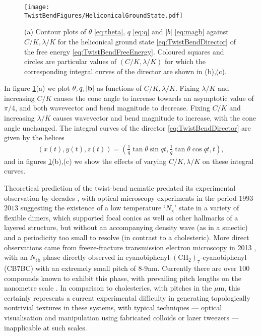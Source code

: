 \begin{figure}[htbp]
    \centering
    \texttt{[image: \\TwistBendFigures/HeliconicalGroundState.pdf]}
    \caption[Heliconical ground state of a twist-bend nematic.]{(a) Contour plots of $\theta$ \eqref{eq:theta}, $q$ \eqref{eq:q} and $|b|$ \eqref{eq:magb} against $C/K, \lambda/K$ for the heliconical ground state \eqref{eq:TwistBendDirector} of the free energy \eqref{eq:TwistBendFreeEnergy}. Coloured squares and circles are particular values of $(C/K, \lambda /K)$ for which the corresponding integral curves of the director are shown in (b),(c).}
    \label{fig:HeliconicalGroundState}
\end{figure}
In figure \ref{fig:HeliconicalGroundState}(a) we plot $\theta, q, |\mathbf{b}|$ as functions of $C/K, \lambda/K$. Fixing $\lambda/K$ and increasing $C/K$ causes the cone angle to increase towards an asymptotic value of $\pi/4$, and both wavevector and bend magnitude to decrease. Fixing $C/K$ and increasing $\lambda/K$ causes wavevector and bend magnitude to increase, with the cone angle unchanged. The integral curves of the director \eqref{eq:TwistBendDirector} are given by the helices
\begin{align}
    (x(t),y(t),z(t)) = (\frac{1}{q} \tan \theta \sin qt, \frac{1}{q} \tan \theta \cos qt,t),
\end{align}
and in figures \ref{fig:HeliconicalGroundState}(b),(c) we show the effects of varying $C/K, \lambda/K$ on these integral curves.

Theoretical prediction of the twist-bend nematic predated its experimental observation by decades \citep{Lavrentovich2018}, with optical microscopy experiments in the period $1993$--$2013$ suggesting the existence of a low temperature `$N_\mathrm{x}$' state in a variety of flexible dimers, which supported focal conics as well as other hallmarks of a layered structure, but without an accompanying density wave (as in a smectic) and a periodicity too small to resolve (in contrast to a cholesteric). More direct observations came from freeze-fracture transmission electron microscopy in 2013 \citep{Borshch2013}, with an $N_{\mathrm{tb}}$ phase directly observed in cyanobiphenyl-$(\mathrm{CH}_2)_7$-cyanobiphenyl (CB$7$BC) with an extremely small pitch of $8$-$9$nm. Currently there are over $100$ compounds known to exhibit this phase, with prevailing pitch lengths on the nanometre scale \citep{Lavrentovich2018}. In comparison to cholesterics, with pitches in the $\mu$m, this certainly represents a current experimental difficulty in generating topologically nontrivial textures in these systems, with typical techniques --- optical visualisation and manipulation using fabricated colloids \citep{Tasinkevych2014} or lazer tweezers \citep{Tkalec2011,Copar2015,Ackerman2017} --- inapplicable at such scales. 
\label{sec:GeometryTopologyOfBend}
